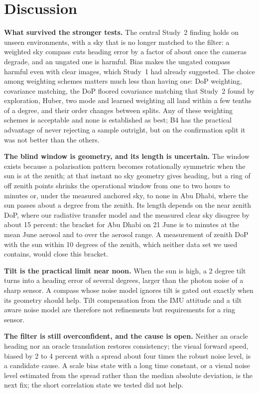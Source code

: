 \section{Discussion}
\textbf{What survived the stronger tests.} The central Study~2 finding holds on unseen environments, with a sky that is no longer matched to the filter: a weighted sky compass cuts heading error by a factor of about \sfactorHone{} once the cameras degrade, and an ungated one is harmful. Bias makes the ungated compass harmful even with clear images, which Study~1 had already suggested. The choice among weighting schemes matters much less than having one: DoP weighting, covariance matching, the DoP floored covariance matching that Study~2 found by exploration, Huber, two mode and learned weighting all land within a few tenths of a degree, and their order changes between splits. Any of these weighting schemes is acceptable and none is established as best; B4 has the practical advantage of never rejecting a sample outright, but on the confirmation split it was not better than the others.

\textbf{The blind window is geometry, and its length is uncertain.} The window exists because a polarisation pattern becomes rotationally symmetric when the sun is at the zenith; at that instant no sky geometry gives heading, but a ring of off zenith points shrinks the operational window from one to two hours to minutes or, under the measured anchored sky, to none in Abu Dhabi, where the sun passes about a degree from the zenith. Its length depends on the near zenith DoP, where our radiative transfer model and the measured clear sky disagree by about 15 percent: the bracket for Abu Dhabi on 21 June is \sWinAnch{} to \sWinRT{} minutes at the mean June aerosol and \sWinMin{} to \sWinMax{} over the aerosol range. A measurement of zenith DoP with the sun within 10 degrees of the zenith, which neither data set we used contains, would close this bracket.

\textbf{Tilt is the practical limit near noon.} When the sun is high, a 2 degree tilt turns into a heading error of several degrees, larger than the photon noise of a sharp sensor. A compass whose noise model ignores tilt is gated out exactly when its geometry should help. Tilt compensation from the IMU attitude \cite{yuan25} and a tilt aware noise model are therefore not refinements but requirements for a ring sensor.

\textbf{The filter is still overconfident, and the cause is open.} Neither an oracle heading nor an oracle translation restores consistency; the visual forward speed, biased by 2 to 4 percent with a spread about four times the robust noise level, is a candidate cause. A scale bias state with a long time constant, or a visual noise level estimated from the spread rather than the median absolute deviation, is the next fix; the short correlation state we tested did not help.

